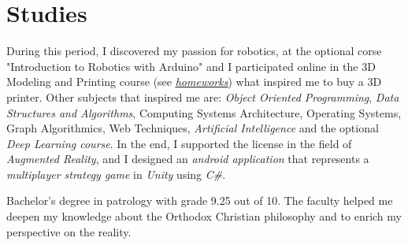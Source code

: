 %


\section{Studies}

{
\idea During this period, I discovered my passion for robotics, at the optional corse "Introduction to Robotics with Arduino" and I participated online in the 3D Modeling and Printing course
(see \href{https://github.com/24Arys11/3D-modeling/tree/main/Homeworks}{\uline{\emph{homeworks}}})
what inspired me to buy a 3D printer.
\idea Other subjects that inspired me are: \emph{Object Oriented Programming}, \emph{ Data Structures and Algorithms}, Computing Systems Architecture, Operating Systems, Graph Algorithmics, Web Techniques, \emph{Artificial Intelligence} and the optional \emph{Deep Learning course}.
\idea In the end, I supported the license in the field of \emph{Augmented Reality}, and I designed an \emph{android application} that represents a \emph{multiplayer strategy game} in \emph{Unity} using \emph{C\#}.
}

{
\idea Bachelor's degree in patrology with grade 9.25 out of 10.
\idea The faculty helped me deepen my knowledge about the Orthodox Christian philosophy and to enrich my perspective on the reality.
}